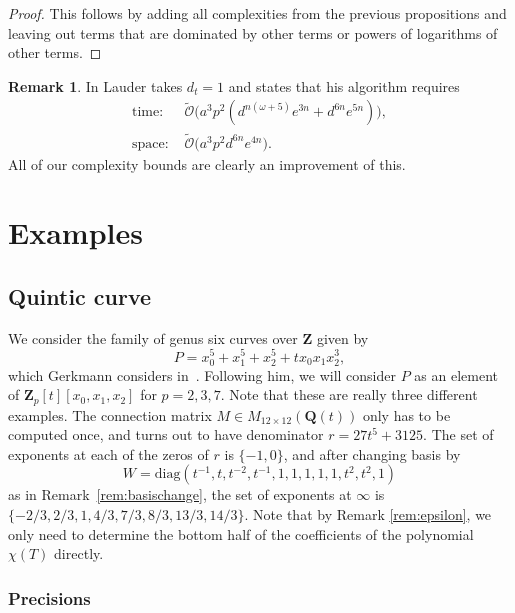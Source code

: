 \documentclass[a4paper,11pt]{article}
\numberwithin{equation}{section}
\newcommand{\ZZ}{\mathbf{Z}} %
\newcommand{\QQ}{\mathbf{Q}} %
\providecommand{\SoftOh}{\tilde{\mathcal{O}}} %
\theoremstyle{definition}
\newtheorem{rem}[thm]{Remark}
\begin{document}
\begin{proof}
This follows by adding all complexities from the previous propositions and 
leaving out terms that are dominated by other terms or powers of
logarithms of other terms.
\end{proof}

\begin{rem} In \citep{Lauder2004a} Lauder takes $d_t=1$ and states that his
algorithm requires
\begin{align*}
\mbox{time: }  &\SoftOh\bigl(a^3 p^2 (d^{n(\omega+5)} e^{3n} + d^{6n} e^{5n}) \bigr), \\ 
\mbox{space: } &\SoftOh\bigl(a^3 p^2 d^{6n} e^{4n} \bigr).
\end{align*}
All of our complexity bounds are clearly an improvement of this.
\end{rem}


\section{Examples}
\label{sec:Examples}

\subsection{Quintic curve}

We consider the family of genus six curves over $\ZZ$ given by 
\begin{equation*}
P=x_0^5 + x_1^5 + x_2^5 + t x_0 x_1 x_2^3,
\end{equation*}
which Gerkmann considers in~\citep[\S 7.4]{Gerkmann2007}. Following him, 
we will consider $P$ as an element of $\ZZ_p[t][x_0,x_1,x_2]$ for 
$p=2,3,7$. Note that these are really three different examples.
The connection matrix $M \in M_{12 \times 12}(\QQ(t))$ only has to 
be computed once, and turns out to have denominator $r=27t^5+3125$. 
The set of exponents at each of the zeros of $r$ is $\{-1,0\}$, and 
after changing basis by
\[ 
W=\mbox{diag}(t^{-1},t,t^{-2},t^{-1},1,1,1,1,1,t^2,t^2,1)
\] 
as in 
Remark~\ref{rem:basischange}, 
the set of exponents  at $\infty$ is $\{-2/3,2/3,1,4/3,7/3,8/3,13/3,14/3\}$. 
Note that by
Remark \ref{rem:epsilon}, we only need to determine the bottom 
half of the coefficients of the polynomial $\chi(T)$ directly.

\subsubsection{Precisions}
\end{document}
